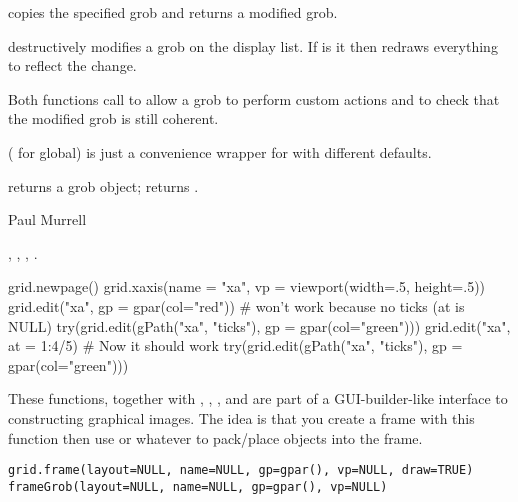 %
\begin{Details}\relax
{} copies the specified grob and returns a modified
grob.

 destructively modifies a grob on the display list.
If 
is  it then redraws everything to reflect the change.

Both functions call  to allow a grob to perform
custom actions and  to check that the modified grob
is still coherent.

 ( for global) is just a convenience wrapper for
 with different defaults.
\end{Details}
%
\begin{Value}
 returns a grob object;   returns .
\end{Value}
%
\begin{Author}\relax
Paul Murrell
\end{Author}
%
\begin{SeeAlso}\relax
{}, ,
, .
\end{SeeAlso}
%
\begin{Examples}
\begin{ExampleCode}
grid.newpage()
grid.xaxis(name = "xa", vp = viewport(width=.5, height=.5))
grid.edit("xa", gp = gpar(col="red"))
# won't work because no ticks (at is NULL)
try(grid.edit(gPath("xa", "ticks"), gp = gpar(col="green")))
grid.edit("xa", at = 1:4/5)
# Now it should work
try(grid.edit(gPath("xa", "ticks"), gp = gpar(col="green")))
\end{ExampleCode}
\end{Examples}
%
\begin{Description}\relax
These functions, together with ,
, , and  are part of a
GUI-builder-like interface to constructing graphical images.
The idea is that you create a frame with this function then
use  or whatever to pack/place objects into the frame.
\end{Description}
%
\begin{Usage}
\begin{verbatim}
grid.frame(layout=NULL, name=NULL, gp=gpar(), vp=NULL, draw=TRUE)
frameGrob(layout=NULL, name=NULL, gp=gpar(), vp=NULL)
\end{verbatim}
\end{Usage}
